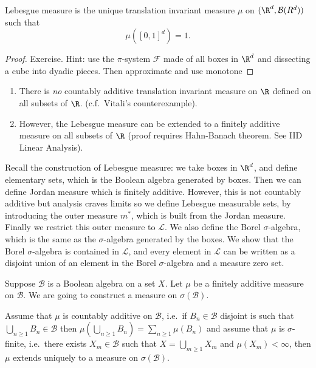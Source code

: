 \documentclass[a4paper]{article}
\begin{document}
\begin{proposition}
  Lebesgue measure is the unique translation invariant measure \(\mu\) on \((\R^d, \mathcal B(R^d))\) such that
  \[
    \mu([0, 1]^d) = 1.
  \]
\end{proposition}

\begin{proof}
  Exercise. Hint: use the \(\pi\)-system \(\mathcal F\) made of all boxes in \(\R^d\) and dissecting a cube into dyadic pieces. Then approximate and use monotone
\end{proof}

\begin{remark}\leavevmode
  \begin{enumerate}
  \item There is \emph{no} countably additive translation invariant measure on \(\R\) defined on all subsets of \(\R\). (c.f.\ Vitali's counterexample).
  \item However, the Lebesgue measure can be extended to a finitely additive measure on all subsets of \(\R\) (proof requires Hahn-Banach theorem. See IID Linear Analysis).
  \end{enumerate}
\end{remark}

Recall the construction of Lebesgue measure: we take boxes in \(\R^d\), and define elementary sets, which is the Boolean algebra generated by boxes. Then we can define Jordan measure which is finitely additive. However, this is not countably additive but analysis craves limits so we define Lebesgue measurable sets, by introducing the outer measure \(m^*\), which is built from the Jordan measure. Finally we restrict this outer measure to \(\mathcal L\). We also define the Borel \(\sigma\)-algebra, which is the same as the \(\sigma\)-algebra generated by the boxes. We show that the Borel \(\sigma\)-algebra is contained in \(\mathcal L\), and every element in \(\mathcal L\) can be written as a disjoint union of an element in the Borel \(\sigma\)-algebra and a measure zero set.

Suppose \(\mathcal B\) is a Boolean algebra on a set \(X\). Let \(\mu\) be a finitely additive measure on \(\mathcal B\). We are going to construct a measure on \(\sigma(\mathcal B)\).

\begin{theorem}
  Assume that \(\mu\) is countably additive on \(\mathcal B\), i.e.\ if \(B_n \in \mathcal B\) disjoint is such that \(\bigcup_{n \geq 1} B_n \in \mathcal B\) then \(\mu(\bigcup_{n \geq 1} B_n) = \sum_{n \geq 1} \mu(B_n)\) and assume that \(\mu\) is \(\sigma\)-finite, i.e.\ there exists \(X_m \in \mathcal B\) such that \(X = \bigcup_{m \geq 1} X_m\) and \(\mu(X_m) < \infty\), then \(\mu\) extends uniquely to a measure on \(\sigma(\mathcal B)\).
\end{theorem}
\end{document}
